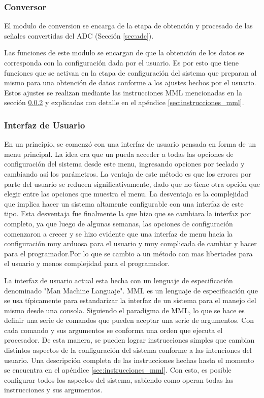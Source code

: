 \documentclass{article}
\theoremstyle{definition}
\theoremstyle{remark}
\begin{document}

\subsubsection{Conversor} %
\label{ssub:conversor}

El modulo de conversion se encarga de la etapa de obtención y procesado de las señales convertidas del ADC (Sección \ref{sec:adc}).

Las funciones de este modulo se encargan de que la obtención de los datos se corresponda con la configuración dada por el usuario. Es por esto que tiene funciones que se activan en la etapa de configuración del sistema que preparan al mismo para una obtención de datos conforme a los ajustes hechos por el usuario. Estos ajustes se realizan mediante las instrucciones MML mencionadas en la sección \ref{ssub:interfaz_de_usuario} y explicadas con detalle en el apéndice \ref{sec:instrucciones_mml}.


\subsubsection{Interfaz de Usuario} %
\label{ssub:interfaz_de_usuario}

En un principio, se comenzó con una interfaz de usuario pensada en forma de un menu principal. La idea era que un pueda acceder a todas las opciones de configuración del sistema desde este menu, ingresando opciones por teclado y cambiando así los parámetros. La ventaja de este método es que los errores por parte del usuario se reducen significativamente, dado que no tiene otra opción que elegir entre las opciones que muestra el menu. La desventaja es la complejidad que implica hacer un sistema altamente configurable con una interfaz de este tipo. Esta desventaja fue finalmente la que hizo que se cambiara la interfaz por completo, ya que luego de algunas semanas, las opciones de configuración comenzaron a crecer y se hizo evidente que una interfaz de menu hacia la configuración muy arduosa para el usuario y muy complicada de cambiar y hacer para el programador.Por lo que se cambio a un método con mas libertades para el usuario y menos complejidad para el programador.

La interfaz de usuario actual esta hecha con un lenguaje de especificación denominado "Man Machine Languaje". MML es un lenguaje de especificación que se usa típicamente para estandarizar la interfaz de un sistema para el manejo del mismo desde una consola. Siguiendo el paradigma de MML, lo que se hace es definir una serie de comandos que pueden aceptar una serie de argumentos. Con cada comando y sus argumentos se conforma una orden que ejecuta el procesador. De esta manera, se pueden lograr instrucciones simples que cambian distintos aspectos de la configuración del sistema conforme a las intenciones del usuario. Una descripción completa de las instrucciones hechas hasta el momento se encuentra en el apéndice \ref{sec:instrucciones_mml}. Con esto, es posible configurar todos los aspectos del sistema, sabiendo como operan todas las instrucciones y sus argumentos.
\end{document}
